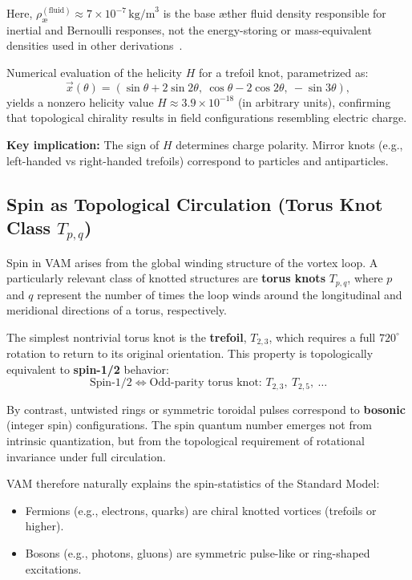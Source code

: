 \documentclass[preprint]{revtex4-2}
\begin{document}
Here, \( \rho_\text{\ae}^{(\text{fluid})} \approx 7 \times 10^{-7} \, \text{kg/m}^3 \) is the base æther fluid density responsible for inertial and Bernoulli responses, not the energy-storing or mass-equivalent densities used in other derivations~\cite{iskandarani2025vam4, iskandarani2025vam-master}.


Numerical evaluation of the helicity \( H \) for a trefoil knot, parametrized as:
\[
\vec{x}(\theta) = \left( \sin \theta + 2 \sin 2\theta,\ \cos \theta - 2 \cos 2\theta,\ -\sin 3\theta \right),
\]
yields a nonzero helicity value \( H \approx 3.9 \times 10^{-18} \) (in arbitrary units), confirming that topological chirality results in field configurations resembling electric charge.

\textbf{Key implication:} The sign of \( H \) determines charge polarity. Mirror knots (e.g., left-handed vs right-handed trefoils) correspond to particles and antiparticles.

\subsection{Spin as Topological Circulation (Torus Knot Class \( T_{p,q} \))}

Spin in VAM arises from the global winding structure of the vortex loop. A particularly relevant class of knotted structures are \textbf{torus knots} \( T_{p,q} \), where \( p \) and \( q \) represent the number of times the loop winds around the longitudinal and meridional directions of a torus, respectively.

The simplest nontrivial torus knot is the \textbf{trefoil}, \( T_{2,3} \), which requires a full \( 720^\circ \) rotation to return to its original orientation. This property is topologically equivalent to \textbf{spin-1/2} behavior:
\[
\text{Spin-1/2} \Longleftrightarrow \text{Odd-parity torus knot: } T_{2,3},\ T_{2,5},\ \ldots
\]

By contrast, untwisted rings or symmetric toroidal pulses correspond to \textbf{bosonic} (integer spin) configurations. The spin quantum number emerges not from intrinsic quantization, but from the topological requirement of rotational invariance under full circulation.

VAM therefore naturally explains the spin-statistics of the Standard Model:
\begin{itemize}
    \item Fermions (e.g., electrons, quarks) are chiral knotted vortices (trefoils or higher).
    \item Bosons (e.g., photons, gluons) are symmetric pulse-like or ring-shaped excitations.
\end{itemize}
\end{document}
